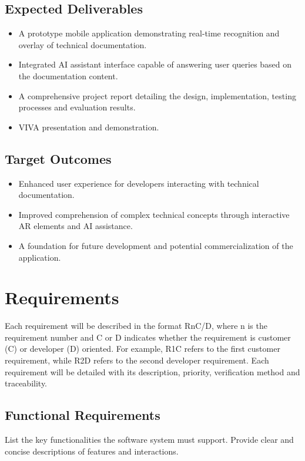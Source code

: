 \documentclass[12pt]{article}
\begin{document}
    \subsection{Expected Deliverables}
    \begin{itemize}
        \item A prototype mobile application demonstrating real-time recognition and overlay of technical documentation.
        \item Integrated AI assistant interface capable of answering user queries based on the documentation content.
        \item A comprehensive project report detailing the design, implementation, testing processes and evaluation results.
        \item VIVA presentation and demonstration.
    \end{itemize}

    \subsection{Target Outcomes}
    \begin{itemize}
        \item Enhanced user experience for developers interacting with technical documentation.
        \item Improved comprehension of complex technical concepts through interactive AR elements and AI assistance.
        \item A foundation for future development and potential commercialization of the application.
    \end{itemize}

\section{Requirements}
Each requirement will be described in the format R{n}C/D, where n is the requirement number and C or D indicates whether the requirement is customer (C) or developer (D) oriented. For example,
R1C refers to the first customer requirement, while R2D refers to the second developer requirement. Each requirement will be detailed with its description, priority, verification method and traceability.

    \subsection{Functional Requirements}
    List the key functionalities the software system must support. Provide clear and concise descriptions of features and interactions.
\end{document}
